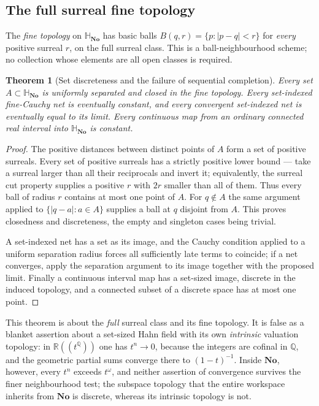 \documentclass[11pt,letterpaper]{article}
\numberwithin{equation}{section}
\newtheorem{theorem}{Theorem}[section]
\theoremstyle{definition}
\theoremstyle{remark}
\newcommand{\No}{\mathbf{No}}
\newcommand{\SQ}{\mathbb H_{\No}}
\newcommand{\R}{\mathbb R}
\newcommand{\Q}{\mathbb Q}
\newcommand{\abs}[1]{\left|#1\right|}
\begin{document}
\subsection{The full surreal fine topology}\label{squat:sub:fine}
The \emph{fine topology} on $\SQ$ has basic balls $B(q,r)=\{p:\abs{p-q}<r\}$ for
\emph{every} positive surreal $r$, on the full surreal class. This is a
ball-neighbourhood scheme; no collection whose elements are all open classes is required.

\begin{theorem}[Set discreteness and the failure of sequential completion]\label{squat:thm:discrete}
Every set $A\subset\SQ$ is uniformly separated and closed in the fine topology. Every
set-indexed fine-Cauchy net is eventually constant, and every convergent set-indexed net
is eventually equal to its limit. Every continuous map from an ordinary connected real
interval into $\SQ$ is constant.
\end{theorem}
\begin{proof}
The positive distances between distinct points of $A$ form a set of positive surreals.
Every set of positive surreals has a strictly positive lower bound --- take a surreal
larger than all their reciprocals and invert it; equivalently, the surreal cut property
supplies a positive $r$ with $2r$ smaller than all of them. Thus every ball of radius $r$
contains at most one point of $A$. For $q\notin A$ the same argument applied to
$\{\abs{q-a}:a\in A\}$ supplies a ball at $q$ disjoint from $A$. This proves closedness
and discreteness, the empty and singleton cases being trivial.

A set-indexed net has a set as its image, and the Cauchy condition applied to a uniform
separation radius forces all sufficiently late terms to coincide; if a net converges,
apply the separation argument to its image together with the proposed limit. Finally a
continuous interval map has a set-sized image, discrete in the induced topology, and a
connected subset of a discrete space has at most one point.
\end{proof}

This theorem is about the \emph{full} surreal class and its fine topology. It is false as
a blanket assertion about a set-sized Hahn field with its own \emph{intrinsic} valuation
topology: in $\R((t^\Q))$ one has $t^n\to0$, because the integers are cofinal in $\Q$, and
the geometric partial sums converge there to $(1-t)^{-1}$. Inside $\No$, however, every
$t^n$ exceeds $t^\omega$, and neither assertion of convergence survives the finer
neighbourhood test; the subspace topology that the entire workspace inherits from $\No$ is
discrete, whereas its intrinsic topology is not.
\end{document}

